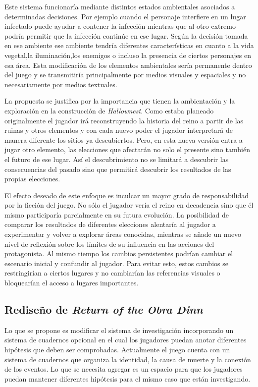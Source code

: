 \documentclass[12pt,a4paper]{article}
\begin{document}
Este sistema funcionaría mediante distintos estados ambientales asociados a determinadas decisiones. Por ejemplo cuando el personaje interfiere en un lugar infectado puede ayudar a contener la infección mientras que al otro extremo podría permitir que la infección continúe en ese lugar. Según la decisión tomada en ese ambiente ese ambiente tendría diferentes características en cuanto a la vida vegetal,la iluminación,los enemigos o incluso la presencia de ciertos personajes en esa área. Esta modificación de los elementos ambientales sería permanente dentro del juego y se transmitiría principalmente por medios visuales y espaciales y no necesariamente por medios textuales.

La propuesta se justifica por la importancia que tienen la ambientación y la exploración en la construcción de \textit{Hallownest}. Como estaba planeado originalmente el jugador irá reconstruyendo la historia del reino a partir de las ruinas y otros elementos y con cada nuevo poder el jugador interpretará de manera diferente los sitios ya descubiertos. Pero, en esta nueva versión entra a jugar otro elemento, las elecciones que afectarán no solo el presente sino también el futuro de ese lugar. Así el descubrimiento no se limitará a descubrir las consecuencias del pasado sino que permitirá descubrir los resultados de las propias elecciones.

El efecto deseado de este enfoque es inculcar un mayor grado de responsabilidad por la ficción del juego. No sólo el jugador vería el reino en decadencia sino que él mismo participaría parcialmente en su futura evolución. La posibilidad de comparar los resultados de diferentes elecciones alentaría al jugador a experimentar y volver a explorar áreas conocidas, mientras se añade un nuevo nivel de reflexión sobre los límites de su influencia en las acciones del protagonista. Al mismo tiempo los cambios persistentes podrían cambiar el escenario inicial y confundir al jugador. Para evitar esto, estos cambios se restringirían a ciertos lugares y no cambiarían las referencias visuales o bloquearían el acceso a lugares importantes.

\subsection{Rediseño de \textit{Return of the Obra Dinn}}
Lo que se propone es modificar el sistema de investigación incorporando un sistema de cuadernos opcional en el cual los jugadores puedan anotar diferentes hipótesis que deben ser comprobadas. Actualmente el juego cuenta con un sistema de cuadernos que organiza la identidad, la causa de muerte y la conexión de los eventos. Lo que se necesita agregar es un espacio para que los jugadores puedan mantener diferentes hipótesis para el mismo caso que están investigando.
\end{document}
